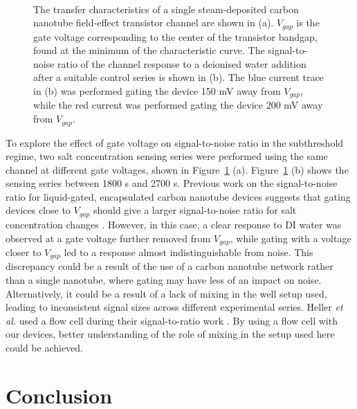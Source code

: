 \documentclass[
  a4paper,
]{scrbook}
\begin{document}
\begin{figure}
\begin{minipage}[t]{0.57\linewidth}
{{}

}

\end{minipage}%
%
\begin{minipage}[t]{0.19\linewidth}

{\centering 

~

}

\end{minipage}%

\caption{\label{fig-salt-conc-SNR}The transfer characteristics of a
single steam-deposited carbon nanotube field-effect transistor channel
are shown in (a). \(V_{gap}\) is the gate voltage corresponding to the
center of the transistor bandgap, found at the minimum of the
characteristic curve. The signal-to-noise ratio of the channel response
to a deionised water addition after a suitable control series is shown
in (b). The blue current trace in (b) was performed gating the device
150 mV away from \(V_{gap}\), while the red current was performed gating
the device 200 mV away from \(V_{gap}\).}

\end{figure}

To explore the effect of gate voltage on signal-to-noise ratio in the
subthreshold regime, two salt concentration sensing series were
performed using the same channel at different gate voltages, shown in
Figure~\ref{fig-salt-conc-SNR} (a). Figure~\ref{fig-salt-conc-SNR} (b)
shows the sensing series between 1800 s and 2700 s. Previous work on the
signal-to-noise ratio for liquid-gated, encapsulated carbon nanotube
devices suggests that gating devices close to \(V_{gap}\) should give a
larger signal-to-noise ratio for salt concentration changes
\autocite{Heller2009}. However, in this case, a clear response to DI
water was observed at a gate voltage further removed from \(V_{gap}\),
while gating with a voltage closer to \(V_{gap}\) led to a response
almost indistinguishable from noise. This discrepancy could be a result
of the use of a carbon nanotube network rather than a single nanotube,
where gating may have less of an impact on noise. Alternatively, it
could be a result of a lack of mixing in the well setup used, leading to
inconsistent signal sizes across different experimental series. Heller
\emph{et al.} used a flow cell during their signal-to-ratio work
\autocite{Heller2009}. By using a flow cell with our devices, better
understanding of the role of mixing in the setup used here could be
achieved.

\hypertarget{conclusion}{%
\section{Conclusion}\label{conclusion}}
\end{document}
